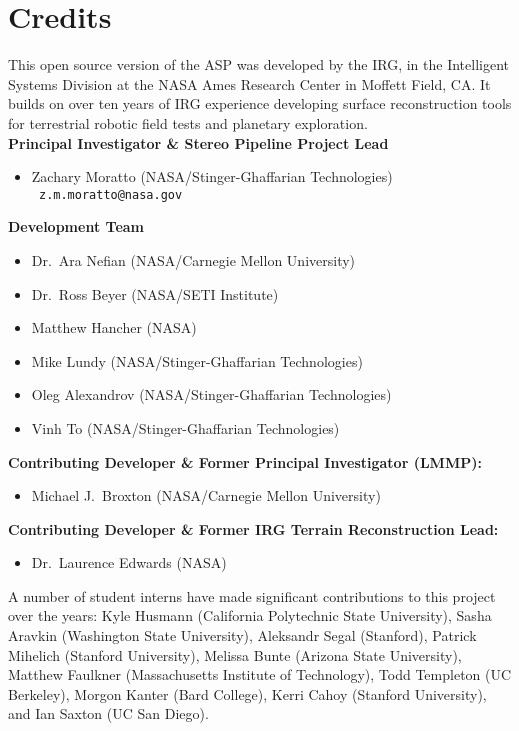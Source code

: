 
\chapter*{Credits}

This open source version of the \ac{ASP} was developed by the
\ac{IRG}, in the Intelligent Systems Division at the \ac{NASA} Ames
Research Center in Moffett Field, CA. It builds on over ten years
of IRG experience developing surface reconstruction tools for
terrestrial robotic field tests and planetary exploration. \\

{\bf Principal Investigator \& Stereo Pipeline Project Lead}
\begin {itemize}
\item Zachary Moratto (NASA/Stinger-Ghaffarian Technologies)\\ {\tt
  z.m.moratto@nasa.gov}
\end{itemize}

{\bf Development Team}
\begin{itemize}
\item Dr.~Ara Nefian (NASA/Carnegie Mellon University)
\item Dr.~Ross Beyer (NASA/SETI Institute)
\item Matthew Hancher (NASA)
\item Mike Lundy (NASA/Stinger-Ghaffarian Technologies)
\item Oleg Alexandrov (NASA/Stinger-Ghaffarian Technologies)
\item Vinh To (NASA/Stinger-Ghaffarian Technologies)
\end{itemize}

{\bf Contributing Developer \& Former Principal Investigator (LMMP):}
\begin{itemize}
\item Michael J.~Broxton (NASA/Carnegie Mellon University)
\end{itemize}

{\bf Contributing Developer \& Former IRG Terrain Reconstruction Lead:}
\begin{itemize}
\item Dr.\ Laurence Edwards (NASA)
\end{itemize}

A number of student interns have made significant contributions to
this project over the years: Kyle Husmann (California Polytechnic
State University), Sasha Aravkin (Washington State University),
Aleksandr Segal (Stanford), Patrick Mihelich (Stanford University),
Melissa Bunte (Arizona State University), Matthew Faulkner
(Massachusetts Institute of Technology), Todd Templeton (UC Berkeley),
Morgon Kanter (Bard College), Kerri Cahoy (Stanford University), and
Ian Saxton (UC San Diego).

